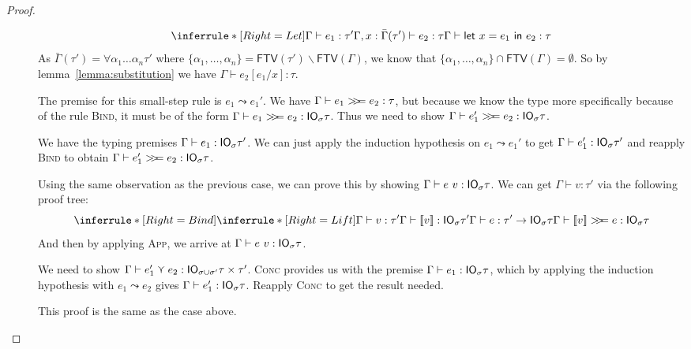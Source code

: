 \begin{proof}
\begin{description}
  \item[]
    $$
    \inferrule*[Right=Let]{\Gamma \vdash e_1 : \tau' \\ \Gamma, x : \bar{\Gamma}(\tau') \vdash e_2 : \tau}{\Gamma \vdash \letin{x = e_1}{e_2} : \tau}
    $$
    As $\bar{\Gamma}(\tau') = \forall \alpha_1 \ldots \alpha_n \tau'$ where $\{\alpha_1,\ldots,\alpha_n\} =
    \textsf{FTV}(\tau') \backslash \textsf{FTV}(\Gamma)$, we know that $\{\alpha_1,\ldots,\alpha_n\} \cap
    \textsf{FTV}(\Gamma) = \emptyset$.
    So by lemma~\ref{lemma:substitution} we have $\Gamma \vdash e_2 [e_1/x] : \tau$.

  \item[]
    The premise for this small-step rule is $e_1 \leadsto e_1'$. We have $\Gamma
    \vdash e_1 >\!\!>\!\!= e_2 : \tau$, but because we know the type more
    specifically because of the rule \textsc{Bind}, it must be of
    the form $\Gamma \vdash e_1 >\!\!>\!\!= e_2 : \mathsf{IO}_\sigma \tau$. Thus we need to show $\Gamma
    \vdash e_1' >\!\!>\!\!= e_2 : \mathsf{IO}_\sigma \tau$.

    We have the typing premises $\Gamma \vdash e_1 : \mathsf{IO}_\sigma \tau'$. We can just
    apply the induction hypothesis on $e_1 \leadsto e_1'$ to get $\Gamma \vdash e_1'
    : \mathsf{IO}_\sigma \tau'$ and reapply \textsc{Bind} to obtain $\Gamma \vdash e_1' >\!\!>\!\!=
    e_2 : \mathsf{IO}_\sigma \tau$.

  \item[]
    Using the same observation as the previous case, we can prove this
    by showing $\Gamma \vdash e \ v : \mathsf{IO}_\sigma \tau$.
    We can get $\Gamma \vdash v : \tau'$ via the following proof tree:
    $$\inferrule*[Right=Bind]{\inferrule*[Right=Lift]{\Gamma \vdash v : \tau'}
      {\Gamma \vdash \lift{v} : \IO_\sigma \tau'} \\ \Gamma \vdash e : \tau' \rightarrow \IO_\sigma \tau}
    {\Gamma \vdash \lift{v} \bind e : \IO_\sigma \tau}$$
    And then by applying \textsc{App}, we arrive at $\Gamma \vdash e \ v : \mathsf{IO}_\sigma
    \tau$.

  \item[]
    We need to show $\Gamma \vdash e_1' \curlyvee e_2 : \mathsf{IO}_{\sigma \cup \sigma'} \tau \times
    \tau'$. \textsc{Conc} provides us with the premise $\Gamma \vdash e_1 : \mathsf{IO}_\sigma
    \tau$, which by applying the induction hypothesis with $e_1 \leadsto e_2$
    gives $\Gamma \vdash e_1' : \mathsf{IO}_\sigma \tau$. Reapply \textsc{Conc} to get the
    result needed.
  \item[]
    This proof is the same as the case above.
    

\end{description}
\end{proof}
